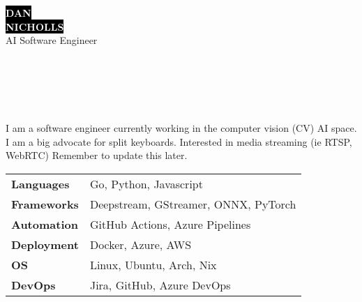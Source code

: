 \documentclass[9pt]{extarticle}
\begin{document}

\begin{minipage}[t]{0.40\textwidth}
	\vspace{-\baselineskip}
	\colorbox{black}{{\HUGE\textcolor{white}{\textbf{\MakeUppercase{Dan}}}}}\\[2pt]
	\colorbox{black}{{\HUGE\textcolor{white}{\textbf{\MakeUppercase{Nicholls}}}}}\\[6pt]
	\vspace{6pt}
	{\LARGE AI Software Engineer}
\end{minipage}
\hfill
\begin{minipage}[t]{0.50\textwidth}
	\vspace{-\baselineskip}
		\\
		\\
		\\
		\\
\end{minipage}

\vspace{0.5cm}


\begin{minipage}[t]{0.45\textwidth}
	\vspace{-\baselineskip}


	I am a software engineer currently working in the computer vision (CV) AI space. I am a big advocate for split keyboards. Interested in media streaming (ie RTSP, WebRTC) Remember to update this later.\\
\end{minipage}
\hfill 
\begin{minipage}[t]{0.5\textwidth}
	\vspace{-\baselineskip}


	\begin{tabular}{@{}p{6em} l@{}}
	\textbf{Languages}   & Go, Python, Javascript \\
	\textbf{Frameworks}  & Deepstream, GStreamer, ONNX, PyTorch \\
	\textbf{Automation}  & GitHub Actions, Azure Pipelines \\
	\textbf{Deployment}  & Docker, Azure, AWS \\
	\textbf{OS}          & Linux, Ubuntu, Arch, Nix \\
	\textbf{DevOps}      & Jira, GitHub, Azure DevOps \\
	\end{tabular}
\end{minipage}
\end{document}
